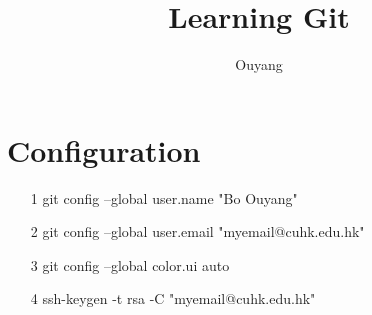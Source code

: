 \documentclass[10pt,a4paper]{article}
\author{Ouyang}
\title{Learning Git}
\begin{document}
	\maketitle
	\section{Configuration}
	\begin{itemize}
		\item[1] git config --global user.name "Bo Ouyang"
		\item[2] git config --global user.email "myemail@cuhk.edu.hk"
		\item[3] git config --global color.ui auto
		\item[4] ssh-keygen -t rsa -C "myemail@cuhk.edu.hk"
	\end{itemize}
\end{document}
